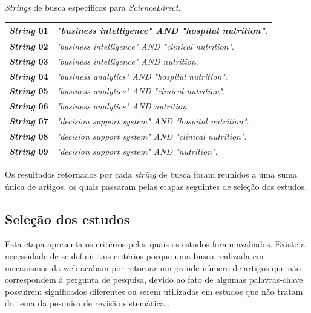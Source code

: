 \begin{quadro}[htb]
\caption{\label{quadro_stringsDeBuscaDIRECT}\textit{Strings} de busca específicas para \textit{ScienceDirect}.}
\label{}
\begin{tabular}{|p{2cm}|p{11cm}|}
	\hline
	\textbf{\textit{String} 01}	& \textit{"business intelligence" AND "hospital nutrition"}.\\ \hline
	\textbf{\textit{String} 02}	& \textit{"business intelligence" AND "clinical nutrition"}.\\ \hline
	\textbf{\textit{String} 03}	& \textit{"business intelligence" AND nutrition}. \\ \hline
	\textbf{\textit{String} 04}	& \textit{"business analytics" AND "hospital nutrition"}.	\\ \hline
    \textbf{\textit{String} 05}	& \textit{"business analytics" AND "clinical nutrition"}. \\ \hline
    \textbf{\textit{String} 06}	& \textit{"business analytics" AND nutrition}. \\ \hline
    \textbf{\textit{String} 07}	& \textit{"decision support system" AND "hospital nutrition"}.\\ \hline
    \textbf{\textit{String} 08}	& \textit{"decision support system" AND "clinical nutrition"}.\\ \hline
    \textbf{\textit{String} 09}	& \textit{"decision support system" AND "nutrition"}.\\ \hline
\end{tabular}
\end{quadro}

Os resultados retornados por cada \textit{string} de busca foram reunidos a uma suma única de artigos, os quais passaram pelas etapas seguintes de seleção dos estudos. 

\subsection{Seleção dos estudos}
Esta etapa apresenta os critérios pelos quais os estudos foram avaliados. Existe a necessidade de se definir tais critérios porque uma busca realizada em mecanismos da web acabam por retornar um grande número de artigos que não correspondem à pergunta de pesquisa, devido ao fato de algumas palavras-chave possuírem significados diferentes ou serem utilizadas em estudos que não tratam do tema da pesquisa de revisão sistemática \cite{biolchini2005, kitchenham2004}.

